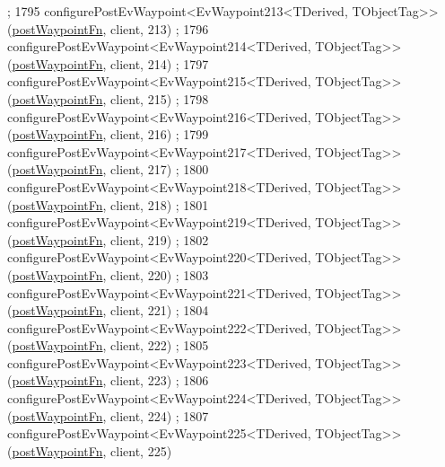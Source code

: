 \begin{DoxyCode}
      ;
1795     configurePostEvWaypoint<EvWaypoint213<TDerived, TObjectTag>>(\hyperlink{classmove__base__z__client_1_1WaypointEventDispatcher_acc538eb7506c13f7cca2268a1742dadd}{postWaypointFn}, client, 213)
      ;
1796     configurePostEvWaypoint<EvWaypoint214<TDerived, TObjectTag>>(\hyperlink{classmove__base__z__client_1_1WaypointEventDispatcher_acc538eb7506c13f7cca2268a1742dadd}{postWaypointFn}, client, 214)
      ;
1797     configurePostEvWaypoint<EvWaypoint215<TDerived, TObjectTag>>(\hyperlink{classmove__base__z__client_1_1WaypointEventDispatcher_acc538eb7506c13f7cca2268a1742dadd}{postWaypointFn}, client, 215)
      ;
1798     configurePostEvWaypoint<EvWaypoint216<TDerived, TObjectTag>>(\hyperlink{classmove__base__z__client_1_1WaypointEventDispatcher_acc538eb7506c13f7cca2268a1742dadd}{postWaypointFn}, client, 216)
      ;
1799     configurePostEvWaypoint<EvWaypoint217<TDerived, TObjectTag>>(\hyperlink{classmove__base__z__client_1_1WaypointEventDispatcher_acc538eb7506c13f7cca2268a1742dadd}{postWaypointFn}, client, 217)
      ;
1800     configurePostEvWaypoint<EvWaypoint218<TDerived, TObjectTag>>(\hyperlink{classmove__base__z__client_1_1WaypointEventDispatcher_acc538eb7506c13f7cca2268a1742dadd}{postWaypointFn}, client, 218)
      ;
1801     configurePostEvWaypoint<EvWaypoint219<TDerived, TObjectTag>>(\hyperlink{classmove__base__z__client_1_1WaypointEventDispatcher_acc538eb7506c13f7cca2268a1742dadd}{postWaypointFn}, client, 219)
      ;
1802     configurePostEvWaypoint<EvWaypoint220<TDerived, TObjectTag>>(\hyperlink{classmove__base__z__client_1_1WaypointEventDispatcher_acc538eb7506c13f7cca2268a1742dadd}{postWaypointFn}, client, 220)
      ;
1803     configurePostEvWaypoint<EvWaypoint221<TDerived, TObjectTag>>(\hyperlink{classmove__base__z__client_1_1WaypointEventDispatcher_acc538eb7506c13f7cca2268a1742dadd}{postWaypointFn}, client, 221)
      ;
1804     configurePostEvWaypoint<EvWaypoint222<TDerived, TObjectTag>>(\hyperlink{classmove__base__z__client_1_1WaypointEventDispatcher_acc538eb7506c13f7cca2268a1742dadd}{postWaypointFn}, client, 222)
      ;
1805     configurePostEvWaypoint<EvWaypoint223<TDerived, TObjectTag>>(\hyperlink{classmove__base__z__client_1_1WaypointEventDispatcher_acc538eb7506c13f7cca2268a1742dadd}{postWaypointFn}, client, 223)
      ;
1806     configurePostEvWaypoint<EvWaypoint224<TDerived, TObjectTag>>(\hyperlink{classmove__base__z__client_1_1WaypointEventDispatcher_acc538eb7506c13f7cca2268a1742dadd}{postWaypointFn}, client, 224)
      ;
1807     configurePostEvWaypoint<EvWaypoint225<TDerived, TObjectTag>>(\hyperlink{classmove__base__z__client_1_1WaypointEventDispatcher_acc538eb7506c13f7cca2268a1742dadd}{postWaypointFn}, client, 225)

\end{DoxyCode}
